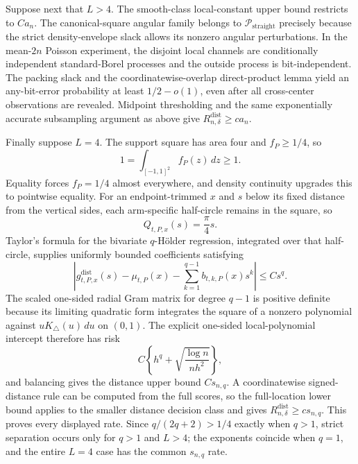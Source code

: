 Suppose next that \(L>4\).  The smooth-class local-constant upper bound restricts to \(Ca_n\).  The canonical-square angular family belongs to \(\mathcal P_{\mathrm{straight}}\) precisely because the strict density-envelope slack allows its nonzero angular perturbations.  In the mean-\(2n\) Poisson experiment, the disjoint local channels are conditionally independent standard-Borel processes and the outside process is bit-independent.  The packing slack and the coordinatewise-overlap direct-product lemma yield an any-bit-error probability at least \(1/2-o(1)\), even after all cross-center observations are revealed.  Midpoint thresholding and the same exponentially accurate subsampling argument as above give \(R_{n,\delta}^{\mathrm{dist}}\geq ca_n\).

Finally suppose \(L=4\).  The support square has area four and \(f_P\geq1/4\), so
\[
 1=\int_{[-1,1]^2}f_P(z)\,dz\geq1.
\]
Equality forces \(f_P=1/4\) almost everywhere, and density continuity upgrades this to pointwise equality.  For an endpoint-trimmed \(x\) and \(s\) below its fixed distance from the vertical sides, each arm-specific half-circle remains in the square, so
\[
 Q_{t,P,x}(s)=\frac\pi4s.
\]
Taylor's formula for the bivariate \(q\)-H\"older regression, integrated over that half-circle, supplies uniformly bounded coefficients satisfying
\[
 \left|g^{\mathrm{dist}}_{t,P,x}(s)-\mu_{t,P}(x)
 -\sum_{k=1}^{q-1}b_{t,k,P}(x)s^k\right|\leq Cs^q.
\]
The scaled one-sided radial Gram matrix for degree \(q-1\) is positive definite because its limiting quadratic form integrates the square of a nonzero polynomial against \(uK_\triangle(u)\,du\) on \((0,1)\).  The explicit one-sided local-polynomial intercept therefore has risk
\[
 C\left\{h^q+\sqrt{\frac{\log n}{nh^2}}\right\},
\]
and balancing gives the distance upper bound \(Cs_{n,q}\).  A coordinatewise signed-distance rule can be computed from the full scores, so the full-location lower bound applies to the smaller distance decision class and gives \(R_{n,\delta}^{\mathrm{dist}}\geq cs_{n,q}\).  This proves every displayed rate.  Since \(q/(2q+2)>1/4\) exactly when \(q>1\), strict separation occurs only for \(q>1\) and \(L>4\); the exponents coincide when \(q=1\), and the entire \(L=4\) case has the common \(s_{n,q}\) rate.